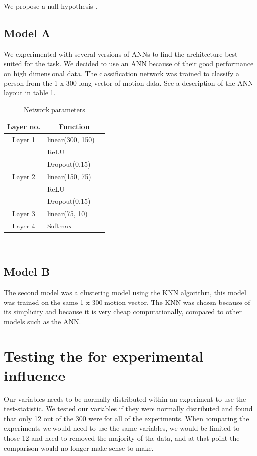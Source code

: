 \documentclass{article}
\begin{document}
We propose a null-hypothesis . 
\subsection{Model A}
We experimented with several versions of ANNs to find the architecture best suited for the task. We decided to use an ANN because of their good performance on high dimensional data. The classification network was trained to classify a person from the 1 x 300 long vector of motion data. See a description of the ANN layout in table \ref{tab:ann}.

\begin{table}[H]
\centering
\begin{tabular}[H]{c l @{} l}
\centering
Layer no.       &
\multicolumn{2}{c}{Function} \\
\hline
Layer 1     & linear(300, 150) \\
            & ReLU \\
            & Dropout(0.15) \\
Layer 2     & linear(150, 75) \\ 
            & ReLU \\
            & Dropout(0.15) \\
Layer 3     & linear(75, 10) \\ 
Layer 4     & Softmax\\ 
\end{tabular}\\
\caption{Network parameters}
\label{tab:ann} 
\end{table}

\subsection{Model B}
The second model was a clustering model using the KNN algorithm, this model was trained on the same 1 x 300 motion vector.
The KNN was chosen because of its simplicity and because it is very cheap computationally, compared to other models such as the ANN.

\section{Testing the for experimental influence}
Our variables needs to be normally distributed within an experiment to use the test-statistic. We tested our variables if they were normally distributed and found that only 12 out of the 300 were for all of the experiments. When comparing the experiments we would need to use the same variables, we would be limited to those 12 and need to removed the majority of the data, and at that point the comparison would no longer make sense to make.
\end{document}
